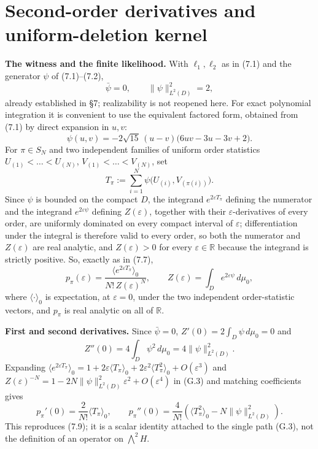 \documentclass[11pt]{article}
\begin{document}
\section{Second-order derivatives and uniform-deletion kernel}

\textbf{The witness and the finite likelihood.} With \(\ell_1,\ell_2\) as in (7.1) and the generator \(\psi\) of (7.1)--(7.2), \[ \bar\psi=0, \qquad \|\psi\|_{L^2(D)}^2=2, \] already established in \S7; realizability is not reopened here. For exact polynomial integration it is convenient to use the equivalent factored form, obtained from (7.1) by direct expansion in \(u,v\): \[ \psi(u,v) =-2\sqrt{15}\,(u-v)\bigl(6uv-3u-3v+2\bigr). \tag{G.1} \] For \(\pi\in S_N\) and two independent families of uniform order statistics \(U_{(1)}<\dots<U_{(N)}\), \(V_{(1)}<\dots<V_{(N)}\), set \[ T_\pi:=\sum_{i=1}^N\psi\bigl(U_{(i)},V_{(\pi(i))}\bigr). \tag{G.2} \] Since \(\psi\) is bounded on the compact \(D\), the integrand \(e^{2\varepsilon T_\pi}\) defining the numerator and the integrand \(e^{2\varepsilon\psi}\) defining \(Z(\varepsilon)\), together with their \(\varepsilon\)-derivatives of every order, are uniformly dominated on every compact interval of \(\varepsilon\); differentiation under the integral is therefore valid to every order, so both the numerator and \(Z(\varepsilon)\) are real analytic, and \(Z(\varepsilon)>0\) for every \(\varepsilon\in\mathbb R\) because the integrand is strictly positive. So, exactly as in (7.7), \[ \boxed{ p_\pi(\varepsilon) =\frac{\bigl\langle e^{2\varepsilon T_\pi}\bigr\rangle_0}        {N!\,Z(\varepsilon)^N}, } \qquad Z(\varepsilon)=\int_De^{2\varepsilon\psi}\,d\mu_0, \tag{G.3} \] where \(\langle\cdot\rangle_0\) is expectation, at \(\varepsilon=0\), under the two independent order-statistic vectors, and \(p_\pi\) is real analytic on all of \(\mathbb R\).

\textbf{First and second derivatives.} Since \(\bar\psi=0\), \(Z'(0)=2\int_D\psi\,d\mu_0=0\) and \[ Z''(0)=4\int_D\psi^2\,d\mu_0=4\|\psi\|_{L^2(D)}^2. \] Expanding \(\langle e^{2\varepsilon T_\pi}\rangle_0 =1+2\varepsilon\langle T_\pi\rangle_0 +2\varepsilon^2\langle T_\pi^2\rangle_0+O(\varepsilon^3)\) and \(Z(\varepsilon)^{-N}=1-2N\|\psi\|_{L^2(D)}^2\varepsilon^2+O(\varepsilon^4)\) in (G.3) and matching coefficients gives \[ \boxed{ p_\pi'(0)=\frac2{N!}\langle T_\pi\rangle_0, } \qquad \boxed{ p_\pi''(0)=\frac4{N!} \left(\langle T_\pi^2\rangle_0-N\|\psi\|_{L^2(D)}^2\right). } \tag{G.4} \] This reproduces (7.9); it is a scalar identity attached to the single path (G.3), not the definition of an operator on \(\bigwedge^2H\).
\end{document}

